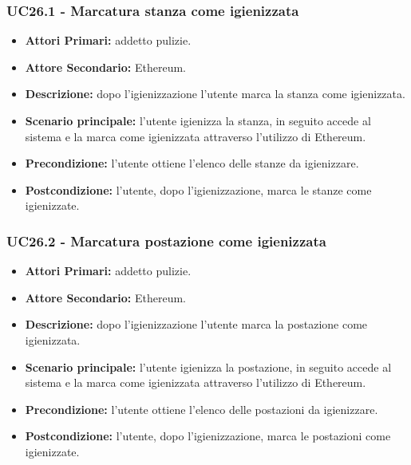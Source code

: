 \subsubsection{UC26.1 - Marcatura stanza come igienizzata}
\begin{itemize}
           	\item\textbf{Attori Primari:} addetto pulizie.
		\item\textbf{Attore Secondario:} Ethereum.
           	\item\textbf{Descrizione:} dopo l'igienizzazione l'utente marca la stanza come igienizzata.
           	\item\textbf{Scenario principale:} l'utente igienizza la stanza, in seguito accede al sistema e la marca come igienizzata attraverso l'utilizzo di Ethereum.
           	\item\textbf{Precondizione:} l'utente ottiene l'elenco delle stanze da igienizzare.
           	\item\textbf{Postcondizione:} l'utente, dopo l'igienizzazione, marca le stanze come igienizzate.
\end{itemize}
\subsubsection{UC26.2 - Marcatura postazione come igienizzata}
\begin{itemize}
           	\item\textbf{Attori Primari:} addetto pulizie.
		\item\textbf{Attore Secondario:} Ethereum.
           	\item\textbf{Descrizione:} dopo l'igienizzazione l'utente marca la postazione come igienizzata.
           	\item\textbf{Scenario principale:} l'utente igienizza la postazione, in seguito accede al sistema e la marca come igienizzata attraverso l'utilizzo di Ethereum.
           	\item\textbf{Precondizione:} l'utente ottiene l'elenco delle postazioni da igienizzare.
           	\item\textbf{Postcondizione:} l'utente, dopo l'igienizzazione, marca le postazioni come igienizzate.
\end{itemize}
